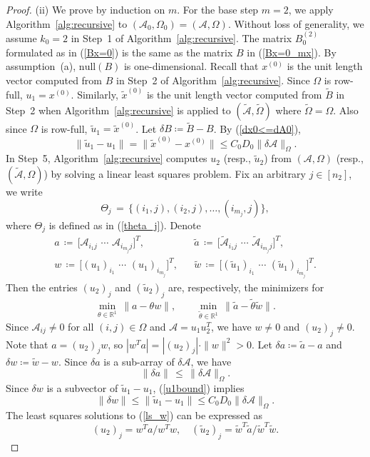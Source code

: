 \documentclass{amsart}
\newcommand{\re}{\mathbb{R}}
\newcommand{\dt}{\delta}
\newcommand{\tomg}{\widetilde{\Omega}}
\newcommand{\ta}{\tilde{a}}
\newcommand{\tu}{\tilde{u}}
\newcommand{\tw}{\tilde{w}}
\newcommand{\tx}{\tilde{x}}
\newcommand{\reff}[1]{(\ref{#1})}
\newcommand{\mc}[1]{\mathcal{#1}}
\newcommand{\ddd}{,\ldots,}
\newcommand{\be}{\begin{equation}}
\newcommand{\ee}{\end{equation}}
\newcommand{\baray}{\begin{array}}
\newcommand{\earay}{\end{array}}
\theoremstyle{definition}
\numberwithin{equation}{section}
\begin{document}
\begin{proof}
\noindent (ii) We prove by induction on $m$.
For the base step $m=2$, we apply Algorithm~\ref{alg:recursive} to 
$(\mc{A}_0, \Omega_0) = (\mc{A}, \Omega)$.
Without loss of generality, we assume $k_0 = 2$ in Step~1 of Algorithm~\ref{alg:recursive}.
The matrix $B_0^{(2)}$ formulated as in \reff{Bx=0} is the same as the matrix $B$ in \reff{Bx=0_mx}.
By assumption~(a), $\text{null}(B)$ is one-dimensional.
Recall that $x^{(0)}$ is the unit length vector computed from $B$ in Step~2 of Algorithm~\ref{alg:recursive}.
Since $\Omega$ is row-full, $u_1 = x^{(0)}$.
Similarly, $\tx^{(0)}$ is the unit length vector computed from $\widetilde{B}$ in Step~2 when Algorithm~\ref{alg:recursive} is applied to $(\widetilde{\mc{A}}, \tomg)$ where $\tomg = \Omega$.
Also since $\Omega$ is row-full, $\tu_1 = \tx^{(0)}$.
Let $\dt B \coloneqq \widetilde{B} - B$.
By \reff{dx0<=dA0}, 
\be\label{u1bound}
\|\tu_1 - u_1\| = \|\tx^{(0)} - x^{(0)}\| \le C_0 D_0 \|\dt \mc{A}\|_{\Omega}.
\ee
In Step~5, Algorithm~\ref{alg:recursive} computes $u_2$ (resp., $\tu_2$) 
from $(\mc{A}, \Omega)$ (resp., $(\widetilde{\mc{A}}, \Omega)$) by solving
a linear least squares problem.
Fix an arbitrary $j \in [n_2]$, 
we write 
\[
\Theta_j \,=\, \{ (i_1, j), (i_2, j) \ddd (i_{m_j}, j) \},
\]
where $\Theta_j$ is defined as in \reff{theta_j}.
Denote 
\[
\baray{lcl}
a \,\coloneqq\, \big[ 
\mc{A}_{i_1 j} \,\, \cdots \,\, \mc{A}_{i_{m_j} j}
\big]^T, &&
\ta \,\coloneqq\, \big[ 
\widetilde{\mc{A}}_{i_1 j} \,\,  \cdots \,\,  \widetilde{\mc{A}}_{i_{m_j} j}
\big]^T, \\
w \,\coloneqq\, \big[ 
(u_1)_{i_1} \,\,  \cdots \,\,  (u_1)_{i_{m_j}}
\big]^T, &&
\tw \,\coloneqq\, \big[ 
(\tu_1)_{i_1} \,\,  \cdots \,\,  (\tu_1)_{i_{m_j}}
\big]^T.
\earay
\]
Then the entries $(u_2)_j$ and $(\tu_2)_j$ are, respectively, the minimizers for
\be\label{ls_w}
\min_{\theta \in \re^1} \, \|a - \theta w\|, \qquad
\min_{\tilde{\theta} \in \re^1} \, \|\ta - \tilde{\theta} \tw\|.
\ee
Since $\mc{A}_{ij} \ne 0$ for all $(i,j) \in \Omega$ and $\mc{A} = u_1u_2^T$,
we have $w \ne 0$ and $(u_2)_j \ne 0$.
Note that $a = (u_2)_j w$, so
$
|w^Ta| = |(u_2)_j| \cdot \|w\|^2 > 0.
$
Let $\dt a \coloneqq \ta - a$ and $\dt w \coloneqq \tw - w$.
Since $\dt a$ is a sub-array of $\dt\mc{A}$, we have
\be\label{da<=dA}
\|\dt a\| \,\le\, \|\dt \mc{A}\|_{\Omega}.
\ee
Since $\dt w$ is a subvector of $\tu_1 - u_1$, \reff{u1bound} implies
\be\label{dw<=dA}
\|\dt w\| \le \|\tu_1 - u_1\| \le C_0 D_0 \|\dt \mc{A}\|_{\Omega}.
\ee
The least squares solutions to \reff{ls_w} can be expressed as
\[
(u_2)_j = w^Ta \big/ w^Tw,
\quad (\tu_2)_j = \tw^T\ta \big/ \tw^T\tw.
\]
\end{proof}
\end{document}
